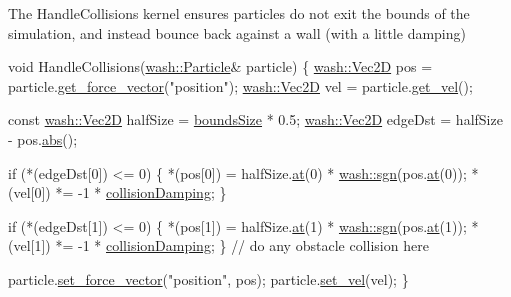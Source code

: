 The Handle\+Collisions kernel ensures particles do not exit the bounds of the simulation, and instead bounce back against a \textquotesingle{}wall\textquotesingle{} (with a little damping) 
\begin{DoxyCode}
\textcolor{keywordtype}{void} HandleCollisions(\mbox{\hyperlink{classwash_1_1Particle}{wash::Particle}}& particle) \{
    \mbox{\hyperlink{classwash_1_1Vec}{wash::Vec2D}} pos = particle.\mbox{\hyperlink{classwash_1_1Particle_a9c6ec5d5a7407897ecca00549bd05c01}{get\_force\_vector}}(\textcolor{stringliteral}{"position"});
    \mbox{\hyperlink{classwash_1_1Vec}{wash::Vec2D}} vel = particle.\mbox{\hyperlink{classwash_1_1Particle_a890d0f1467225393e385872b0c98b974}{get\_vel}}();

    \textcolor{keyword}{const} \mbox{\hyperlink{classwash_1_1Vec}{wash::Vec2D}} halfSize = \mbox{\hyperlink{3d__fluid__sim_2fluid__sim_8cpp_ae3c8d23dc2c71306f6366b252c3ffb18}{boundsSize}} * 0.5;
    \mbox{\hyperlink{classwash_1_1Vec}{wash::Vec2D}} edgeDst = halfSize - pos.\mbox{\hyperlink{classwash_1_1Vec_aae15a1a2cea7e883e53c2e7f6164710a}{abs}}();

    \textcolor{keywordflow}{if} (*(edgeDst[0]) <= 0) \{
        *(pos[0]) = halfSize.\mbox{\hyperlink{classwash_1_1Vec_a1be26013b6d4f898b8504fc258043400}{at}}(0) * \mbox{\hyperlink{namespacewash_a706d6d30508a81b6b9f25494cd759dff}{wash::sgn}}(pos.\mbox{\hyperlink{classwash_1_1Vec_a1be26013b6d4f898b8504fc258043400}{at}}(0));
        *(vel[0]) *= -1 * \mbox{\hyperlink{3d__fluid__sim_2fluid__sim_8cpp_ab103ceb8127270461e6653cc3a770182}{collisionDamping}};
    \}

    \textcolor{keywordflow}{if} (*(edgeDst[1]) <= 0) \{
        *(pos[1]) = halfSize.\mbox{\hyperlink{classwash_1_1Vec_a1be26013b6d4f898b8504fc258043400}{at}}(1) * \mbox{\hyperlink{namespacewash_a706d6d30508a81b6b9f25494cd759dff}{wash::sgn}}(pos.\mbox{\hyperlink{classwash_1_1Vec_a1be26013b6d4f898b8504fc258043400}{at}}(1));
        *(vel[1]) *= -1 * \mbox{\hyperlink{3d__fluid__sim_2fluid__sim_8cpp_ab103ceb8127270461e6653cc3a770182}{collisionDamping}};
    \}
    \textcolor{comment}{// do any obstacle collision here}

    particle.\mbox{\hyperlink{classwash_1_1Particle_a6960cdd169d1829a52e49cf835a8bfeb}{set\_force\_vector}}(\textcolor{stringliteral}{"position"}, pos);
    particle.\mbox{\hyperlink{classwash_1_1Particle_a4755365883cfd62117ebe74fe44d35e0}{set\_vel}}(vel);
\}
\end{DoxyCode}
 